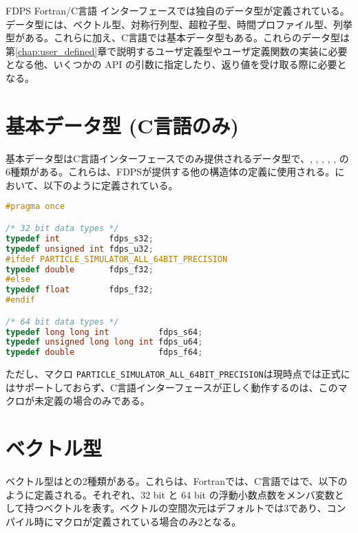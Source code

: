 FDPS Fortran/C言語 インターフェースでは独自のデータ型が定義されている。データ型には、ベクトル型、対称行列型、超粒子型、時間プロファイル型、列挙型がある。これらに加え、C言語では基本データ型もある。これらのデータ型は第\ref{chap:user_defined}章で説明するユーザ定義型やユーザ定義関数の実装に必要となる他、いくつかの API の引数に指定したり、返り値を受け取る際に必要となる。

\section{基本データ型 {\small (C言語のみ)}}
\label{sec:basic_types}
基本データ型はC言語インターフェースでのみ提供されるデータ型で、, , , , , の6種類がある。これらは、FDPSが提供する他の構造体の定義に使用される。において、以下のように定義されている。

\begin{lstlisting}[language=C,caption=基本データ型 (C言語のみ)]
#pragma once

/* 32 bit data types */
typedef int          fdps_s32;
typedef unsigned int fdps_u32;
#ifdef PARTICLE_SIMULATOR_ALL_64BIT_PRECISION
typedef double       fdps_f32;
#else
typedef float        fdps_f32;
#endif

/* 64 bit data types */
typedef long long int          fdps_s64;
typedef unsigned long long int fdps_u64;
typedef double                 fdps_f64;
\end{lstlisting}
ただし、マクロ \verb|PARTICLE_SIMULATOR_ALL_64BIT_PRECISION|は現時点では正式にはサポートしておらず、C言語インターフェースが正しく動作するのは、このマクロが未定義の場合のみである。


\section{ベクトル型}
\label{sec:vector_types}
ベクトル型はとの2種類がある。これらは、Fortranでは、C言語ではで、以下のように定義される。それぞれ、32 bit と 64 bit の浮動小数点数をメンバ変数として持つベクトルを表す。ベクトルの空間次元はデフォルトでは3であり、コンパイル時にマクロが定義されている場合のみ2となる。

